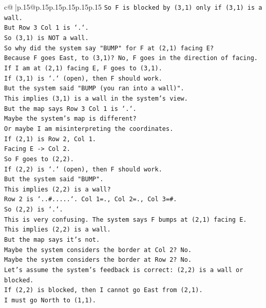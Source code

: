 \documentclass{article}
\begin{document}
{\begin{supertabular}{c@{$\;$}|p{.15\linewidth}@{}p{.15\linewidth}p{.15\linewidth}p{.15\linewidth}p{.15\linewidth}p{.15\linewidth}}
{{{\texttt{So F is blocked by (3,1) only if (3,1) is a wall.} \\
\texttt{But Row 3 Col 1 is `.`.} \\
\texttt{So (3,1) is NOT a wall.} \\
\texttt{So why did the system say "BUMP" for F at (2,1) facing E?} \\
\texttt{Because F goes East, to (3,1)? No, F goes in the direction of facing.} \\
\texttt{If I am at (2,1) facing E, F goes to (3,1).} \\
\texttt{If (3,1) is `.` (open), then F should work.} \\
\texttt{But the system said "BUMP (you ran into a wall)".} \\
\texttt{This implies (3,1) is a wall in the system's view.} \\
\texttt{But the map says Row 3 Col 1 is `.`.} \\
\texttt{Maybe the system's map is different?} \\
\texttt{Or maybe I am misinterpreting the coordinates.} \\
\texttt{If (2,1) is Row 2, Col 1.} \\
\texttt{Facing E {-}> Col 2.} \\
\texttt{So F goes to (2,2).} \\
\texttt{If (2,2) is `.` (open), then F should work.} \\
\texttt{But the system said "BUMP".} \\
\texttt{This implies (2,2) is a wall?} \\
\texttt{Row 2 is `..\#.....`. Col 1=., Col 2=., Col 3=\#.} \\
\texttt{So (2,2) is `.`.} \\
\texttt{This is very confusing. The system says F bumps at (2,1) facing E.} \\
\texttt{This implies (2,2) is a wall.} \\
\texttt{But the map says it's not.} \\
\texttt{Maybe the system considers the border at Col 2? No.} \\
\texttt{Maybe the system considers the border at Row 2? No.} \\
\texttt{Let's assume the system's feedback is correct: (2,2) is a wall or blocked.} \\
\texttt{If (2,2) is blocked, then I cannot go East from (2,1).} \\
\texttt{I must go North to (1,1).} \\
}}}
\end{supertabular}}
\end{document}
